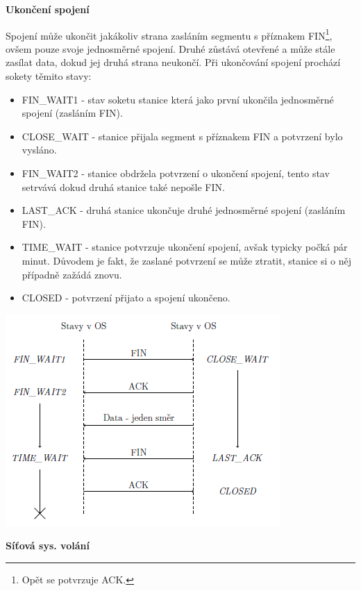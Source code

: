 \vspace{0,5cm}
\textbf{Ukončení spojení}

Spojení může ukončit jakákoliv strana zasláním segmentu s příznakem FIN\footnote{Opět se potvrzuje ACK.}, ovšem pouze svoje jednosměrné spojení. Druhé zůstává otevřené a může stále zasílat data, dokud jej druhá strana neukončí. Při ukončování spojení prochází sokety těmito stavy:
\begin{itemize}
    \item FIN\_WAIT1 - stav soketu stanice která jako první ukončila jednosměrné spojení (zasláním FIN).
    \item CLOSE\_WAIT - stanice přijala segment s příznakem FIN a potvrzení bylo vysláno. 
    \item FIN\_WAIT2 - stanice obdržela potvrzení o ukončení spojení, tento stav setrvává dokud druhá stanice také nepošle FIN. 
    \item LAST\_ACK - druhá stanice ukončuje druhé jednosměrné spojení (zasláním FIN).
    \item TIME\_WAIT - stanice potvrzuje ukončení spojení, avšak typicky počká pár minut. Důvodem je fakt, že zaslané potvrzení se může ztratit, stanice si o něj případně zažádá znovu. 
    \item CLOSED - potvrzení přijato a spojení ukončeno.
\end{itemize}

\begin{center}
    \includegraphics[scale=1]{images/network_tcp_close.png}
\end{center}

\begin{Large}
    \vspace{0,5cm}
    \textbf{Síťová sys. volání}
\end{Large}

